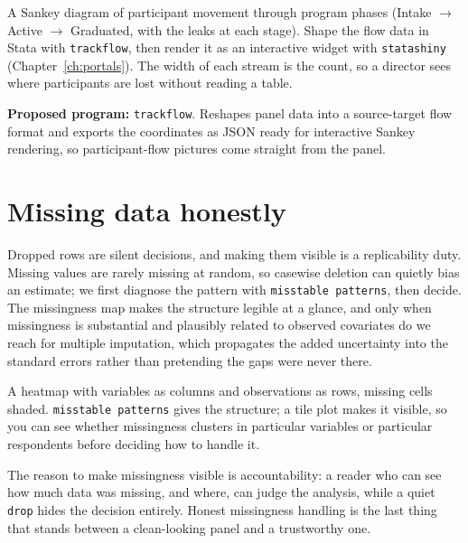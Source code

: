 \documentclass[
    a4paper,
    fontsize=10pt,
    twoside=true,
    numbers=noenddot,
]{kaobook}
\newenvironment{vizcallout}[1][Visualization to build]{%
    \begin{vizbox}[frametitle={#1}]%
}{%
    \end{vizbox}%
}
\begin{document}
\begin{vizcallout}[Visualization to build: the Sankey flow]
A Sankey diagram of participant movement through program phases (Intake $\rightarrow$ Active $\rightarrow$ Graduated, with the leaks at each stage). Shape the flow data in Stata with \texttt{trackflow}, then render it as an interactive widget with \texttt{statashiny} (Chapter~\ref{ch:portals}). The width of each stream is the count, so a director sees where participants are lost without reading a table.
\end{vizcallout}

\begin{kaobox}[frametitle=Ado-file Idea: \texttt{trackflow}]
\textbf{Proposed program:} \texttt{trackflow}. Reshapes panel data into a source-target flow format and exports the coordinates as JSON ready for interactive Sankey rendering, so participant-flow pictures come straight from the panel.
\end{kaobox}

\section{Missing data honestly}
Dropped rows are silent decisions, and making them visible is a replicability duty. Missing values are rarely missing at random, so casewise deletion can quietly bias an estimate; we first diagnose the pattern with \texttt{misstable patterns}, then decide. The missingness map makes the structure legible at a glance, and only when missingness is substantial and plausibly related to observed covariates do we reach for multiple imputation, which propagates the added uncertainty into the standard errors rather than pretending the gaps were never there.

\begin{vizcallout}[Visualization to build: the missingness map]
A heatmap with variables as columns and observations as rows, missing cells shaded. \texttt{misstable patterns} gives the structure; a tile plot makes it visible, so you can see whether missingness clusters in particular variables or particular respondents before deciding how to handle it.
\end{vizcallout}

The reason to make missingness visible is accountability: a reader who can see how much data was missing, and where, can judge the analysis, while a quiet \texttt{drop} hides the decision entirely. Honest missingness handling is the last thing that stands between a clean-looking panel and a trustworthy one.
\end{document}
